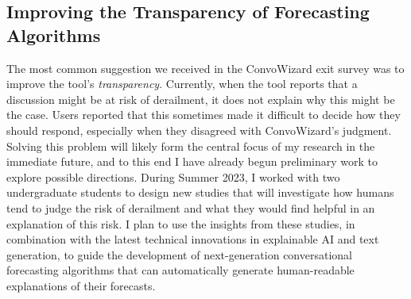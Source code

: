 \documentclass[12pt,letterpaper]{article}
\begin{document}
\subsection{Improving the Transparency of Forecasting Algorithms}
The most common suggestion we received in the ConvoWizard exit survey was to improve the tool's \emph{transparency}.
Currently, when the tool reports that a discussion might be at risk of derailment, it does not explain why this might be the case.
Users reported that this sometimes made it difficult to decide how they should respond, especially when they disagreed with ConvoWizard's judgment.
Solving this problem will likely form the central focus of my research in the immediate future, and to this end I have already begun preliminary work to explore possible directions.
During Summer 2023, I worked with two undergraduate students to design new studies that will investigate how humans tend to judge the risk of derailment and what they would find helpful in an explanation of this risk.
I plan to use the insights from these studies, in combination with the latest technical innovations in explainable AI and text generation, to guide the development of next-generation conversational forecasting algorithms that can automatically generate human-readable explanations of their forecasts.

\end{document}
